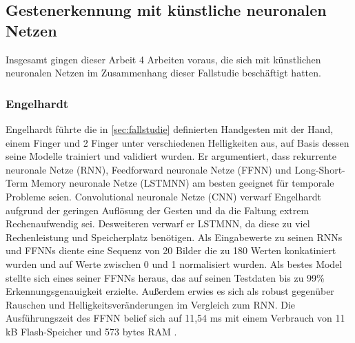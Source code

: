 \subsection{Gestenerkennung mit künstliche neuronalen Netzen}
Insgesamt gingen dieser Arbeit 4 Arbeiten voraus, die sich mit künstlichen neuronalen Netzen im Zusammenhang dieser Fallstudie beschäftigt hatten.

\subsubsection{Engelhardt}
Engelhardt führte die in \ref{sec:fallstudie} definierten Handgesten mit der Hand, einem Finger und 2 Finger unter verschiedenen Helligkeiten aus, auf Basis dessen seine Modelle trainiert und validiert wurden. Er
argumentiert, dass rekurrente neuronale Netze (RNN), Feedforward neuronale Netze (FFNN) und Long-Short-Term Memory neuronale Netze (LSTMNN) am besten geeignet für temporale Probleme seien. Convolutional neuronale
Netze (CNN) verwarf Engelhardt aufgrund der geringen Auflösung der Gesten und da die Faltung extrem Rechenaufwendig sei. Desweiteren verwarf er LSTMNN, da diese zu viel Rechenleistung und Speicherplatz
benötigen. Als Eingabewerte zu seinen RNNs und FFNNs diente eine Sequenz von 20 Bilder die zu 180 Werten konkatiniert wurden und auf Werte zwischen 0 und 1 normalisiert wurden. Als bestes Model stellte sich eines
seiner FFNNs heraus, das auf seinen Testdaten bis zu 99\% Erkennungsgenauigkeit erzielte. Außerdem erwies es sich als robust gegenüber Rauschen und Helligkeitsveränderungen im Vergleich zum RNN. Die Ausführungszeit
des FFNN belief sich auf 11,54 ms mit einem Verbrauch von 11 kB Flash-Speicher und 573 bytes RAM \cite{engelhardtThesis}.

